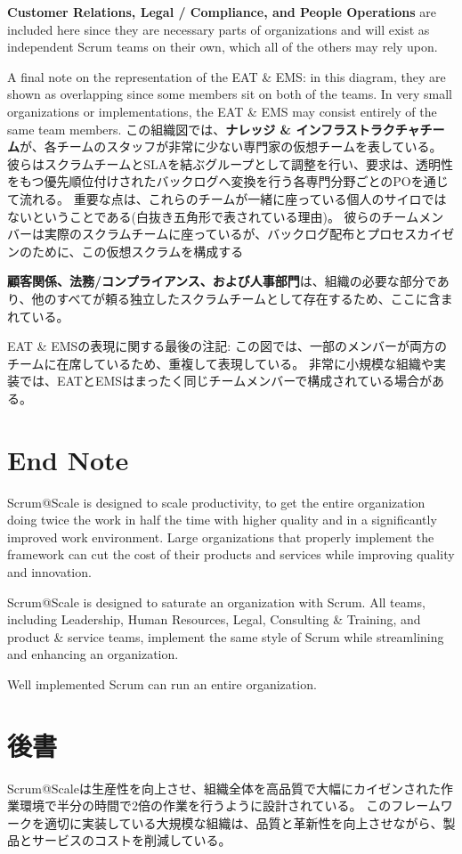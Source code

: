 \documentclass[12pt,a4paper,parskip=full]{scrartcl}
\begin{document}
\textbf{Customer Relations, Legal / Compliance, and People Operations} are
included here since they are necessary parts of organizations and will
exist as independent Scrum teams on their own, which all of the others may
rely upon.

A final note on the representation of the EAT \& EMS: in this diagram, they
are shown as overlapping since some members sit on both of the teams. In very
small organizations or implementations, the EAT \& EMS may consist entirely
of the same team members.
\fi
この組織図では、\textbf{ナレッジ \& インフラストラクチャチーム}が、各チームのスタッフが非常に少ない専門家の仮想チームを表している。
彼らはスクラムチームとSLAを結ぶグループとして調整を行い、要求は、透明性をもつ優先順位付けされたバックログへ変換を行う各専門分野ごとのPOを通じて流れる。
重要な点は、これらのチームが一緒に座っている個人のサイロではないということである(白抜き五角形で表されている理由)。
彼らのチームメンバーは実際のスクラムチームに座っているが、バックログ配布とプロセスカイゼンのために、この仮想スクラムを構成する

\textbf{顧客関係、法務/コンプライアンス、および人事部門}は、組織の必要な部分であり、他のすべてが頼る独立したスクラムチームとして存在するため、ここに含まれている。

EAT \& EMSの表現に関する最後の注記: この図では、一部のメンバーが両方のチームに在席しているため、重複して表現している。
非常に小規模な組織や実装では、EATとEMSはまったく同じチームメンバーで構成されている場合がある。

\section{End Note}
Scrum@Scale is designed to scale productivity, to get the entire
organization doing twice the work in half the time with higher quality and
in a significantly improved work environment. Large organizations that
properly implement the framework can cut the cost of their products and
services while improving quality and innovation.

Scrum@Scale is designed to saturate an organization with Scrum. All teams,
including Leadership, Human Resources, Legal, Consulting \& Training, and
product \& service teams, implement the same style of Scrum while
streamlining and enhancing an organization.

Well implemented Scrum can run an entire organization.
\fi
\section{後書}
Scrum@Scaleは生産性を向上させ、組織全体を高品質で大幅にカイゼンされた作業環境で半分の時間で2倍の作業を行うように設計されている。
このフレームワークを適切に実装している大規模な組織は、品質と革新性を向上させながら、製品とサービスのコストを削減している。
\end{document}
